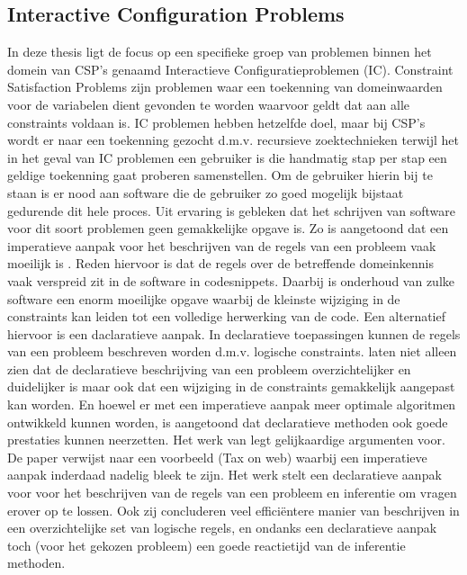 \subsection{Interactive Configuration Problems}
In deze thesis ligt de focus op een specifieke groep van problemen binnen het domein van CSP's genaamd Interactieve Configuratieproblemen (IC). Constraint Satisfaction Problems zijn problemen waar een toekenning van domeinwaarden voor de variabelen dient gevonden te worden waarvoor geldt dat aan alle constraints voldaan is. IC problemen hebben hetzelfde doel, maar bij CSP's wordt er naar een toekenning gezocht d.m.v. recursieve zoektechnieken terwijl het in het geval van IC problemen een gebruiker is die handmatig stap per stap een geldige toekenning gaat proberen samenstellen. Om de gebruiker hierin bij te staan is er nood aan software die de gebruiker zo goed mogelijk bijstaat gedurende dit hele proces. Uit ervaring is gebleken dat het schrijven van software voor dit soort problemen geen gemakkelijke opgave is. Zo is aangetoond dat een imperatieve aanpak voor het beschrijven van de regels van een probleem vaak moeilijk is \citep{gelle1996interactive}. Reden hiervoor is dat de regels over de betreffende domeinkennis vaak verspreid zit in de software in codesnippets. Daarbij is onderhoud van zulke software een enorm moeilijke opgave waarbij de kleinste wijziging in de constraints kan leiden tot een volledige herwerking van de code. Een alternatief hiervoor is een daclaratieve aanpak. In declaratieve toepassingen kunnen de regels van een probleem beschreven worden d.m.v. logische constraints. \cite{gelle1996interactive} laten niet alleen zien dat de declaratieve beschrijving van een probleem overzichtelijker en duidelijker is maar ook dat een wijziging in de constraints gemakkelijk aangepast kan worden. En hoewel er met een imperatieve aanpak meer optimale algoritmen ontwikkeld kunnen worden, is aangetoond dat declaratieve methoden ook goede prestaties kunnen neerzetten. Het werk van\citep{vlaeminck2009logical} legt gelijkaardige argumenten voor. De paper verwijst naar een voorbeeld (Tax on web) waarbij een imperatieve aanpak inderdaad nadelig bleek te zijn. Het werk stelt een declaratieve aanpak voor voor het beschrijven van de regels van een probleem en inferentie om vragen erover op te lossen. Ook zij concluderen veel effici\"{e}ntere manier van beschrijven in een overzichtelijke set van logische regels, en ondanks een declaratieve aanpak toch (voor het gekozen probleem) een goede reactietijd van de inferentie methoden.

